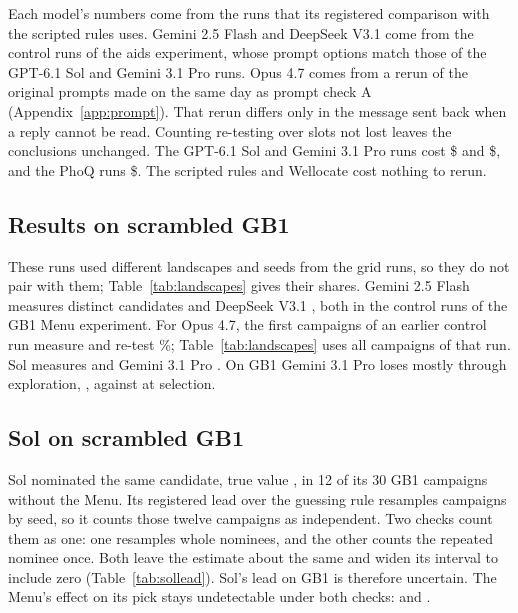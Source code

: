 Each model's numbers come from the runs that its registered comparison with the scripted rules uses. Gemini 2.5 Flash and DeepSeek V3.1 come from the control runs of the aids experiment, whose prompt options match those of the GPT-6.1 Sol and Gemini 3.1 Pro runs. Opus 4.7 comes from a rerun of the original prompts made on the same day as prompt check A (Appendix~\ref{app:prompt}). That rerun differs only in the message sent back when a reply cannot be read. Counting re-testing over slots not lost leaves the conclusions unchanged. The GPT-6.1 Sol and Gemini 3.1 Pro runs cost \$\nSolSpend{} and \$\nGemSpend, and the PhoQ runs \$\nPqSpend. The scripted rules and Wellocate cost nothing to rerun.

\subsection{Results on scrambled GB1}

These runs used different landscapes and seeds from the grid runs, so they do not pair with them; Table~\ref{tab:landscapes} gives their shares. Gemini 2.5 Flash measures \nGbDistinctFlash{}
distinct candidates and DeepSeek V3.1 \nGbDistinctDeep, both in the control runs of the GB1 Menu experiment. For Opus 4.7, the first \nPqNOpus{} campaigns of an earlier control run measure \nGbDistinctOpus{} and re-test \nGbShareOpus\%; Table~\ref{tab:landscapes} uses all \nGbNOpus{} campaigns of that run. Sol measures \nGbDistinctSol{} and Gemini
3.1 Pro \nGbDistinctPro. On GB1 Gemini 3.1 Pro loses mostly through exploration, \nGbExplPro, against \nGbSelPro{} at
selection.

\subsection{Sol on scrambled GB1}
\label{app:atwo}

Sol nominated the same candidate, true value \nFsrmTrue, in 12 of its 30 GB1 campaigns without the Menu. Its registered lead over the
guessing rule resamples campaigns by seed, so it counts those twelve campaigns as independent. Two checks count them as one: one resamples whole nominees, and the other counts the repeated nominee once. Both leave the estimate about the same and widen its interval to include zero (Table~\ref{tab:sollead}). Sol's lead on GB1 is therefore uncertain. The Menu's effect on its pick stays undetectable under both checks: \nSolGbMenuClu{} \nSolGbMenuCluci{} and \nSolGbMenuCol{}
\nSolGbMenuColci.

